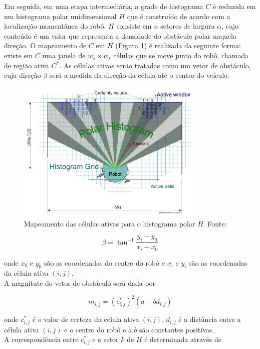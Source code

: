 Em seguida, em uma etapa intermediária, a grade de histograma $C$ é reduzida em um histograma polar unidimensional $H$ que é construído de acordo com a localização momentânea do robô. $H$ consiste em $n$ setores de largura $\alpha$, cujo conteúdo é um valor que representa a densidade do obstáculo polar naquela direção. O mapeamento de $C$ em $H$ (Figura \ref{fig:map_grid_polar}) é realizada da seguinte forma: existe em $C$ uma janela de $w_{s} \times w_{s}$ células que se move junto do robô, chamada de região ativa $C^{*}$. As células ativas serão tratadas como um vetor de obstáculo, cuja direção $\beta$ será a medida da direção da célula até o centro do veículo.

\begin{figure}[H]
    \centering
    \includegraphics[width=0.8\textwidth]{img/map_grid_polar}
    \caption{Mapeamento das células ativas para o histograma polar $H$. Fonte: \cite{c1}}
    \label{fig:map_grid_polar}
\end{figure}

$$\beta = \tan^{-1}\frac{y_{i}-y_{0}}{x_{i}-x_{0}}$$

onde $x_{0}$ e $y_{0}$ são as coordenadas do centro do robô e $x_{i}$ e $y_{i}$ são as coordenadas da célula ativa $(i,j)$.
\\

A magnitute do vetor de obstáculo será dada por

$$m_{i,j} = (c^{*}_{i,j})^{2} (a - bd_{i,j})$$

onde $c^{*}_{i,j}$ é o valor de certeza da célula ativa $(i,j)$, $d_{i,j}$ é a distância entre a célula ativa $(i,j)$ e o centro do robô e $a$,$b$ são constantes positivas.
\\

A correspondência entre $c^{*}_{i,j}$ e o setor $k$ de $H$ é determinada através de

